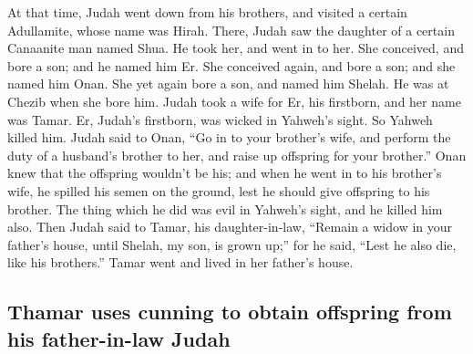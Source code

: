  At that time, Judah went down from his brothers, and
visited a certain Adullamite, whose name was Hirah. 
There, Judah saw the daughter of a certain Canaanite man named Shua. He
took her, and went in to her.  She conceived, and bore a
son; and he named him Er.  She conceived again, and bore a
son; and she named him Onan.  She yet again bore a son,
and named him Shelah. He was at Chezib when she bore him. 
Judah took a wife for Er, his firstborn, and her name was Tamar.
 Er, Judah's firstborn, was wicked in Yahweh's sight. So
Yahweh killed him.  Judah said to Onan, ``Go in to your
brother's wife, and perform the duty of a husband's brother to her, and
raise up offspring for your brother.''  Onan knew that the
offspring wouldn't be his; and when he went in to his brother's wife, he
spilled his semen on the ground, lest he should give offspring to his
brother.  The thing which he did was evil in Yahweh's
sight, and he killed him also.  Then Judah said to Tamar,
his daughter-in-law, ``Remain a widow in your father's house, until
Shelah, my son, is grown up;'' for he said, ``Lest he also die, like his
brothers.'' Tamar went and lived in her father's house.

\hypertarget{thamar-uses-cunning-to-obtain-offspring-from-his-father-in-law-judah}{%
\subsection{Thamar uses cunning to obtain offspring from his
father-in-law
Judah}\label{thamar-uses-cunning-to-obtain-offspring-from-his-father-in-law-judah}}

